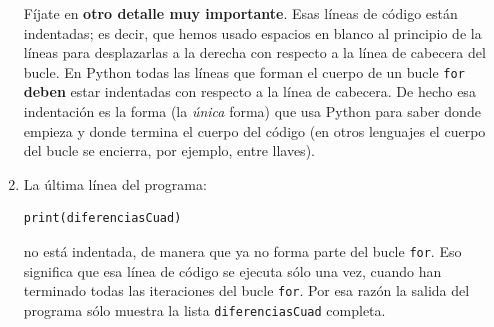 \documentclass[10pt,a4paper]{article}\usepackage[]{graphicx}\usepackage[]{color}
\makeatletter
\newenvironment{kframe}{%
 \def\at@end@of@kframe{}%
 \ifinner\ifhmode%
  \def\at@end@of@kframe{\end{minipage}}%
  \begin{minipage}{\columnwidth}%
 \fi\fi%
 \def\FrameCommand##1{\hskip\@totalleftmargin \hskip-\fboxsep
 \colorbox{shadecolor}{##1}\hskip-\fboxsep
     \hskip-\linewidth \hskip-\@totalleftmargin \hskip\columnwidth}%
 \MakeFramed {\advance\hsize-\width
   \@totalleftmargin\z@ \linewidth\hsize
   \@setminipage}}%
 {\par\unskip\endMakeFramed%
 \at@end@of@kframe}
\newenvironment{knitrout}{}{} %
\makeatother
\begin{document}
\begin{enumerate}
Fíjate en {\bf otro detalle muy importante}. Esas líneas de código están {\sf indentadas}; es decir, que hemos usado espacios en blanco al principio de la líneas para desplazarlas a la derecha con respecto a la línea de cabecera del bucle. En Python todas las líneas que forman el cuerpo de un bucle {\tt for} {\bf deben} estar indentadas con respecto a la línea de cabecera. De hecho esa indentación es la forma (la {\em única} forma) que usa Python para saber donde empieza y donde termina el cuerpo del código (en otros lenguajes el cuerpo del bucle se encierra, por ejemplo, entre llaves).

\item La última línea del programa:
\begin{knitrout}
\color{fgcolor}\begin{kframe}
\begin{verbatim}
print(diferenciasCuad)
\end{verbatim}
\end{kframe}
\end{knitrout}
no está indentada, de manera que ya no forma parte del bucle {\tt for}. Eso significa que esa línea de código se ejecuta sólo una vez, cuando han terminado todas las iteraciones del bucle {\tt for}. Por esa razón la salida del programa sólo muestra la lista {\tt diferenciasCuad} completa. 

\end{enumerate}
\end{document}
